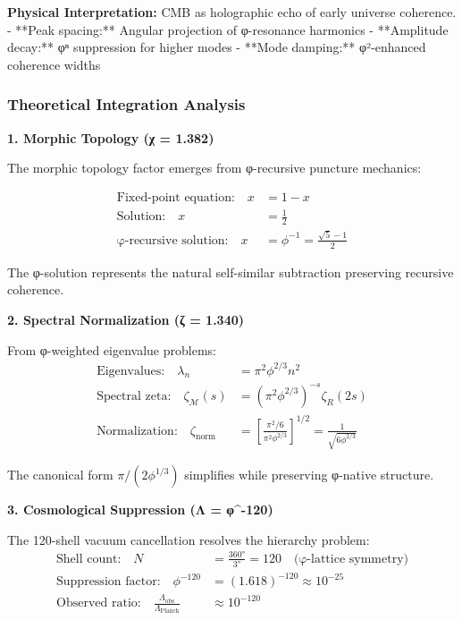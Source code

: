 \textbf{Physical Interpretation:} CMB as holographic echo of early universe coherence.
- **Peak spacing:** Angular projection of φ-resonance harmonics
- **Amplitude decay:** φⁿ suppression for higher modes  
- **Mode damping:** φ²-enhanced coherence widths

\subsubsection{Theoretical Integration Analysis}

\textbf{1. Morphic Topology (χ = 1.382)}

The morphic topology factor emerges from φ-recursive puncture mechanics:

\begin{align}
\text{Fixed-point equation:} \quad x &= 1 - x \\
\text{Solution:} \quad x &= \frac{1}{2} \\
\text{φ-recursive solution:} \quad x &= \phi^{-1} = \frac{\sqrt{5}-1}{2}
\end{align}

The φ-solution represents the natural self-similar subtraction preserving recursive coherence.

\textbf{2. Spectral Normalization (ζ = 1.340)}

From φ-weighted eigenvalue problems:
\begin{align}
\text{Eigenvalues:} \quad \lambda_n &= \pi^2 \phi^{2/3} n^2 \\
\text{Spectral zeta:} \quad \zeta_{\mathcal{M}}(s) &= (\pi^2 \phi^{2/3})^{-s} \zeta_R(2s) \\
\text{Normalization:} \quad \zeta_{\text{norm}} &= \left[\frac{\pi^2/6}{\pi^2 \phi^{2/3}}\right]^{1/2} = \frac{1}{\sqrt{6\phi^{2/3}}}
\end{align}

The canonical form $\pi/(2\phi^{1/3})$ simplifies while preserving φ-native structure.

\textbf{3. Cosmological Suppression (Λ = φ^{-120})}

The 120-shell vacuum cancellation resolves the hierarchy problem:
\begin{align}
\text{Shell count:} \quad N &= \frac{360°}{3°} = 120 \quad \text{(φ-lattice symmetry)} \\
\text{Suppression factor:} \quad \phi^{-120} &= (1.618)^{-120} \approx 10^{-25} \\
\text{Observed ratio:} \quad \frac{\Lambda_{\text{obs}}}{\Lambda_{\text{Planck}}} &\approx 10^{-120}
\end{align}

